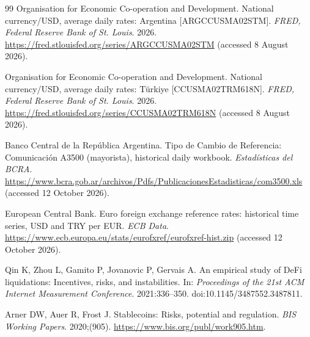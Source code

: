 \begin{thebibliography}{99}
Organisation for Economic Co-operation and Development.
National currency/USD, average daily rates: Argentina [ARGCCUSMA02STM].
\textit{FRED, Federal Reserve Bank of St. Louis}. 2026. \url{https://fred.stlouisfed.org/series/ARGCCUSMA02STM} (accessed 8 August 2026).

Organisation for Economic Co-operation and Development.
National currency/USD, average daily rates: T{\"u}rkiye [CCUSMA02TRM618N].
\textit{FRED, Federal Reserve Bank of St. Louis}. 2026. \url{https://fred.stlouisfed.org/series/CCUSMA02TRM618N} (accessed 8 August 2026).

Banco Central de la Rep\'ublica Argentina.
Tipo de Cambio de Referencia: Comunicaci\'on A3500 (mayorista), historical daily workbook.
\textit{Estad\'isticas del BCRA}. \url{https://www.bcra.gob.ar/archivos/Pdfs/PublicacionesEstadisticas/com3500.xls} (accessed 12 October 2026).

European Central Bank.
Euro foreign exchange reference rates: historical time series, USD and TRY per EUR.
\textit{ECB Data}. \url{https://www.ecb.europa.eu/stats/eurofxref/eurofxref-hist.zip} (accessed 12 October 2026).

Qin K, Zhou L, Gamito P, Jovanovic P, Gervais A.
An empirical study of DeFi liquidations: Incentives, risks, and instabilities.
In: \textit{Proceedings of the 21st ACM Internet Measurement Conference}. 2021:336--350.
doi:10.1145/3487552.3487811.

Arner DW, Auer R, Frost J.
Stablecoins: Risks, potential and regulation.
\textit{BIS Working Papers}. 2020;(905). \url{https://www.bis.org/publ/work905.htm}.

\end{thebibliography}
